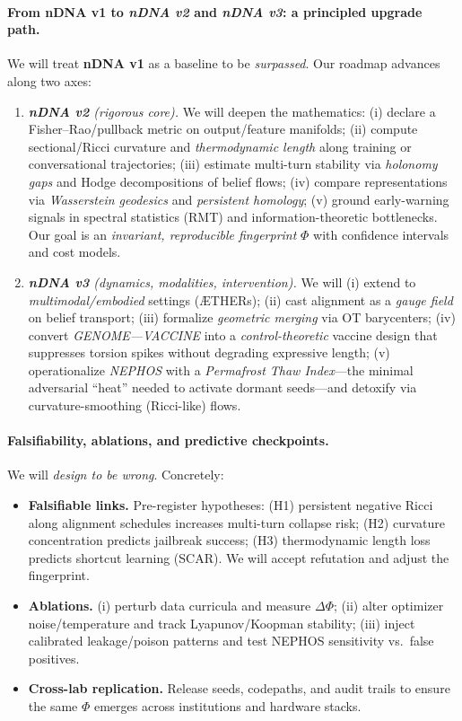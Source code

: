 \documentclass[11pt]{article}
\begin{document}
\paragraph{From \textbf{nDNA v1} to \emph{nDNA v2} and \emph{nDNA v3}: a principled upgrade path.}
We will treat \textbf{nDNA v1} as a baseline to be \emph{surpassed}. Our roadmap advances along two axes:
\begin{enumerate}
  \item \emph{\textbf{nDNA v2} (rigorous core).} We will deepen the mathematics: (i) declare a Fisher--Rao/pullback metric on output/feature manifolds; (ii) compute sectional/Ricci curvature and \emph{thermodynamic length} along training or conversational trajectories; (iii) estimate multi-turn stability via \emph{holonomy gaps} and Hodge decompositions of belief flows; (iv) compare representations via \emph{Wasserstein geodesics} and \emph{persistent homology}; (v) ground early-warning signals in spectral statistics (RMT) and information-theoretic bottlenecks. Our goal is an \emph{invariant, reproducible fingerprint} $\Phi$ with confidence intervals and cost models.
  \item \emph{\textbf{nDNA v3} (dynamics, modalities, intervention).} We will (i) extend to \emph{multimodal/embodied} settings (ÆTHERs); (ii) cast alignment as a \emph{gauge field} on belief transport; (iii) formalize \emph{geometric merging} via OT barycenters; (iv) convert \emph{GENOME—VACCINE} into a \emph{control-theoretic} vaccine design that suppresses torsion spikes without degrading expressive length; (v) operationalize \emph{NEPHOS} with a \emph{Permafrost Thaw Index}—the minimal adversarial “heat” needed to activate dormant seeds—and detoxify via curvature-smoothing (Ricci-like) flows.
\end{enumerate}

\paragraph{Falsifiability, ablations, and predictive checkpoints.}
We will \emph{design to be wrong}. Concretely:
\begin{itemize}
  \item \textbf{Falsifiable links.} Pre-register hypotheses: (H1) persistent negative Ricci along alignment schedules increases multi-turn collapse risk; (H2) curvature concentration predicts jailbreak success; (H3) thermodynamic length loss predicts shortcut learning (SCAR). We will accept refutation and adjust the fingerprint.
  \item \textbf{Ablations.} (i) perturb data curricula and measure $\Delta\Phi$; (ii) alter optimizer noise/temperature and track Lyapunov/Koopman stability; (iii) inject calibrated leakage/poison patterns and test NEPHOS sensitivity vs.\ false positives.
  \item \textbf{Cross-lab replication.} Release seeds, codepaths, and audit trails to ensure the same $\Phi$ emerges across institutions and hardware stacks.
\end{itemize}
\end{document}
